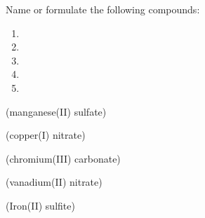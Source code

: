 \documentclass[main.tex]{subfiles}
\begin{document}
\begin{multicols*}{2}
\begin{question}[ID=\the\value{numA}]
Name or formulate the following compounds:
   \begin{multicols}{2}\noindent
  \begin{enumerate} [topsep=0pt, partopsep=0pt, label=(\alph*), leftmargin=.5cm]
\item  {} %
\item  {} %
\item  {} %
\item  {} %
\item  {} %
\end{enumerate}  \end{multicols} 
\end{question}
\begin{solution}
\begin{inparaenum}[(a)]
\item  {}  (manganese(II) sulfate)
\item  {}  (copper(I) nitrate)
\item  {}  (chromium(III) carbonate)
\item  {}  (vanadium(II) nitrate)
\item  {}  (Iron(II) sulfite)
\end{inparaenum}\hspace{0.1cm}\end{solution}




\end{multicols*}
\end{document}
